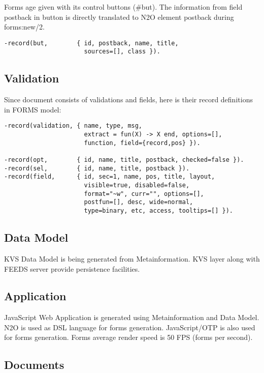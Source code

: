 Forms age given with its control buttons (\#but).
The information from field postback in button is directly translated
to N2O element postback during forms:new/2.

\vspace{1\baselineskip}
\begin{lstlisting}
-record(but,        { id, postback, name, title,
                      sources=[], class }).
\end{lstlisting}

\subsection{Validation}
Since document consists of validations and fields, here is their
record definitions in FORMS model:

\vspace{1\baselineskip}
\begin{lstlisting}
-record(validation, { name, type, msg,
                      extract = fun(X) -> X end, options=[],
                      function, field={record,pos} }).

-record(opt,        { id, name, title, postback, checked=false }).
-record(sel,        { id, name, title, postback }).
-record(field,      { id, sec=1, name, pos, title, layout,
                      visible=true, disabled=false,
                      format="~w", curr="", options=[],
                      postfun=[], desc, wide=normal,
                      type=binary, etc, access, tooltips=[] }).
\end{lstlisting}

\subsection{Data Model}
KVS Data Model is being generated from Metainformation.
KVS layer along with FEEDS server provide persistence facilities.

\subsection{Application}
JavaScript Web Application is generated using Metainformation and Data Model.
N2O is used as DSL language for forms generation.
JavaScript/OTP is also used for forms generation.
Forms average render speed is 50 FPS (forms per second).

\subsection{Documents}

